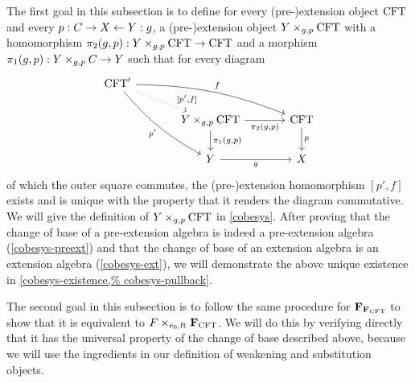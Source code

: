 The first goal in this subsection is to define for every (pre-)extension object 
$\mathrm{CFT}$ and every $p:C\rightarrow X\leftarrow Y:g$, a (pre-)extension
object $\cobesys{Y}{\stesys}{g}{p}$ with a homomorphism $\pullbackpr{2}{g}{p}:
\cobesys{Y}{\stesys}{g}{p}\to\stesys$ and a morphism $\pullbackpr{1}{g}{p}:
\pullback{Y}{\stesysc}{g}{p}\to Y$ such that for every diagram
\begin{equation*}
\begin{tikzcd}[column sep=large]
\stesys'
  \ar[bend right=10]{ddr}[swap]{p'}
  \ar[bend left=10]{rrd}{f}
  \ar[dotted]{dr}[near end]{[p',f]}
  \\
  {}&
\cobesys{Y}{\stesys}{g}{p}
  \ar{d}{\pullbackpr{1}{g}{p}}
  \ar{r}[swap]{\pullbackpr{2}{g}{p}}
  &
\stesys
  \ar{d}{p}
  \\
  {}&
Y \ar{r}[swap]{g}
  &
X
\end{tikzcd}
\end{equation*}
of which the outer square commutes, the (pre-)extension homomorphism $[p',f]$ exists
and is unique with the property that it renders the diagram commutative. We will
give the definition of $\cobesys{Y}{\stesys}{g}{p}$ in \autoref{cobesys}. After
proving that the change of base of a pre-extension algebra is indeed a
pre-extension algebra (\autoref{cobesys-preext}) and that the change of base
of an extension algebra is an extension algebra (\autoref{cobesys-ext}), we
will demonstrate the above unique existence in \autoref{cobesys-existence,%
cobesys-pullback}.

The second goal in this subsection is to follow the same procedure for
$\mathbf{F}_{\mathbf{F}_{\mathrm{CFT}}}$ to show that it is equivalent to
$\cobesys{\stesysf}{\famesys{\stesys}}{\ectxext}{\eft}$. We will do this by
verifying directly that it has the universal property of the change of base
described above, because we will use the ingredients in our definition of
weakening and substitution objects.

